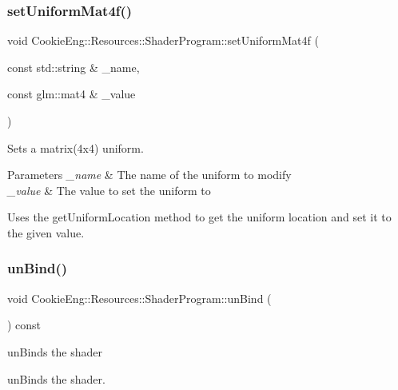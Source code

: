 \subsubsection{\texorpdfstring{set\+Uniform\+Mat4f()}{setUniformMat4f()}}
{\footnotesize\ttfamily void Cookie\+Eng\+::\+Resources\+::\+Shader\+Program\+::set\+Uniform\+Mat4f (\begin{DoxyParamCaption}\item[{const std\+::string \&}]{\+\_\+name,  }\item[{const glm\+::mat4 \&}]{\+\_\+value }\end{DoxyParamCaption})}



Sets a matrix(4x4) uniform. 


\begin{DoxyParams}{Parameters}
{\em \+\_\+name} & The name of the uniform to modify \\
\hline
{\em \+\_\+value} & The value to set the uniform to\\
\hline
\end{DoxyParams}
Uses the get\+Uniform\+Location method to get the uniform location and set it to the given value. \mbox{\label{class_cookie_eng_1_1_resources_1_1_shader_program_a3fad7ebcee80d0cae25dfcca62c70e63}} 
\subsubsection{\texorpdfstring{un\+Bind()}{unBind()}}
{\footnotesize\ttfamily void Cookie\+Eng\+::\+Resources\+::\+Shader\+Program\+::un\+Bind (\begin{DoxyParamCaption}{ }\end{DoxyParamCaption}) const}



un\+Binds the shader 

un\+Binds the shader. \mbox{\label{class_cookie_eng_1_1_resources_1_1_shader_program_aaf510d906b80d93a10e90fa0fea26bb2}} 
